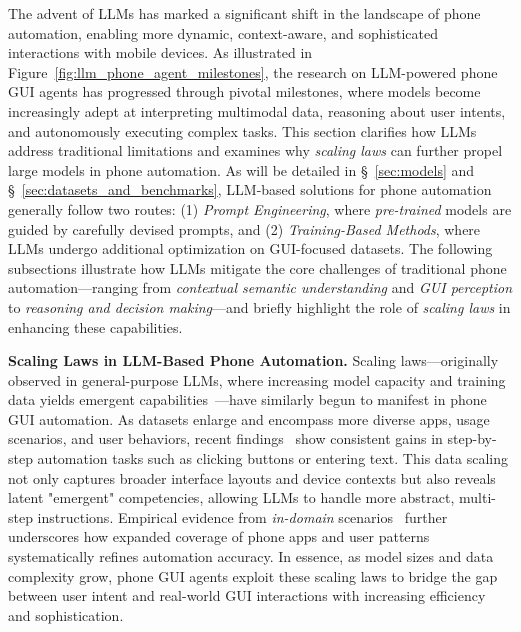 The advent of LLMs has marked a significant shift in the landscape of phone automation, enabling more dynamic, context-aware, and sophisticated interactions with mobile devices. As illustrated in Figure~\ref{fig:llm_phone_agent_milestones}, the research on LLM-powered phone GUI agents has progressed through pivotal milestones, where models become increasingly adept at interpreting multimodal data, reasoning about user intents, and autonomously executing complex tasks. This section clarifies how LLMs address traditional limitations and examines why \emph{scaling laws} can further propel large models in phone automation.
As will be detailed in \S\ \ref{sec:models} and \S\ \ref{sec:datasets_and_benchmarks}, LLM-based solutions for phone automation generally follow two routes: (1) \emph{Prompt Engineering}, where \emph{pre-trained} models are guided by carefully devised prompts, and (2) \emph{Training-Based Methods}, where LLMs undergo additional optimization on GUI-focused datasets. The following subsections illustrate how LLMs mitigate the core challenges of traditional phone automation—ranging from \emph{contextual semantic understanding} and \emph{GUI perception} to \emph{reasoning and decision making}—and briefly highlight the role of \emph{scaling laws} in enhancing these capabilities.



\noindent\textbf{Scaling Laws in LLM-Based Phone Automation.}
Scaling laws—originally observed in general-purpose LLMs, where increasing model capacity and training data yields emergent capabilities~\cite{brown2020language,kaplan2020scaling,hagendorff2023machine}—have similarly begun to manifest in phone GUI automation. As datasets enlarge and encompass more diverse apps, usage scenarios, and user behaviors, recent findings~\cite{cheng2024seeclick,chen2024guicourse,lu2024guiodyssey,pawlowski2024tinyclick} show consistent gains in step-by-step automation tasks such as clicking buttons or entering text. This data scaling not only captures broader interface layouts and device contexts but also reveals latent "emergent" competencies, allowing LLMs to handle more abstract, multi-step instructions. Empirical evidence from \emph{in-domain} scenarios~\cite{li2024androidcontrol} further underscores how expanded coverage of phone apps and user patterns systematically refines automation accuracy. In essence, as model sizes and data complexity grow, phone GUI agents exploit these scaling laws to bridge the gap between user intent and real-world GUI interactions with increasing efficiency and sophistication.



